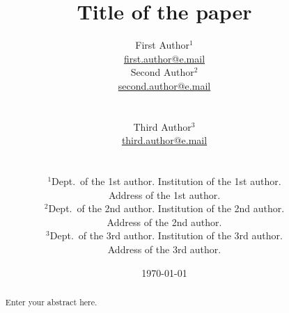 \documentclass[10pt,twoside]{article}
\theoremstyle{remark}
\theoremstyle{definition}
\begin{document}
\title{Title of the paper}

\author{
\begin{minipage}[c]{0.3\linewidth}
\centering
First Author$^{1}$\\
\url{first.author@e.mail}
\end{minipage}
\begin{minipage}[c]{0.4\linewidth}
\centering
  Second Author$^{2}$\\
  \url{second.author@e.mail}
\end{minipage}\\ [0,3in]
\begin{minipage}[c]{0.4\linewidth}
\centering
  Third Author$^{3}$\\
  \url{third.author@e.mail}
\end{minipage}\\
\begin{minipage}[c]{0.9\linewidth}
\centering
\vspace{\baselineskip}\noindent
$^{1}$Dept.~of the 1st author. Institution of the 1st author.\\
  Address of the 1st author.\\
\vspace{0.75\baselineskip}
$^{2}$Dept.~of the 2nd author. Institution of the 2nd author.\\
  Address of the 2nd author.\\
\vspace{0.75\baselineskip}
$^{3}$Dept.~of the 3rd author. Institution of the 3rd author.\\
  Address of the 3rd author.\\
\vspace{0.75\baselineskip}
\end{minipage}}

\date{\today}
\maketitle

\begin{abstract}
Enter your abstract here.


\end{abstract}
\end{document}
